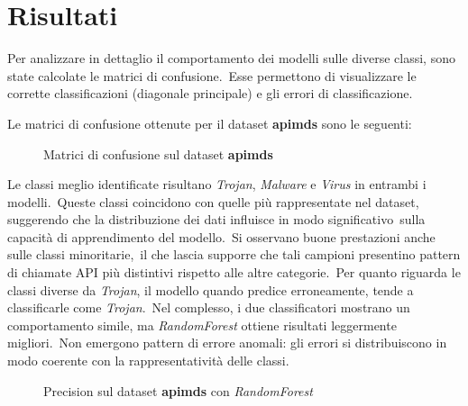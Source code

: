 \newcommand{\mtrdescription}[1]{Matrici di confusione sul dataset \textbf{#1}}
\newcommand{\clsdescription}[1]{Precision sul dataset \textbf{#1}}
\newcommand{\prcdescription}[3]{#3 sul dataset \textbf{#1} con \textit{#2}}
\newcommand{\grpdescription}[1]{Overall accuracy, micro e macro metriche sul dataset \textbf{#1}}

\section{Risultati}

Per analizzare in dettaglio il comportamento dei modelli sulle diverse classi, sono state calcolate le matrici di confusione.\
Esse permettono di visualizzare le corrette classificazioni (diagonale principale) e gli errori di classificazione.




Le matrici di confusione ottenute per il dataset \textbf{apimds} sono le seguenti:

\begin{figure}[ht]
    \centering
    \caption{\mtrdescription{apimds}}
    \label{fig:apimds-mtrx-rf}
\end{figure}

Le classi meglio identificate risultano \textit{Trojan}, \textit{Malware} e \textit{Virus} in entrambi i modelli.\
Queste classi coincidono con quelle più rappresentate nel dataset, suggerendo che la distribuzione dei dati influisce in modo significativo\
sulla capacità di apprendimento del modello.\
Si osservano buone prestazioni anche sulle classi minoritarie,\
il che lascia supporre che tali campioni presentino pattern di chiamate API più distintivi rispetto alle altre categorie.\
Per quanto riguarda le classi diverse da \textit{Trojan}, il modello quando predice erroneamente, tende a classificarle come \textit{Trojan}.\
Nel complesso, i due classificatori mostrano un comportamento simile, ma \textit{RandomForest} ottiene risultati leggermente migliori.\
Non emergono pattern di errore anomali: gli errori si distribuiscono in modo coerente con la rappresentatività delle classi.


\begin{figure}[]
    \centering
    \caption{\prcdescription{apimds}{RandomForest}{Precision}}
    \label{fig:apimds-rf-prc}
\end{figure}

